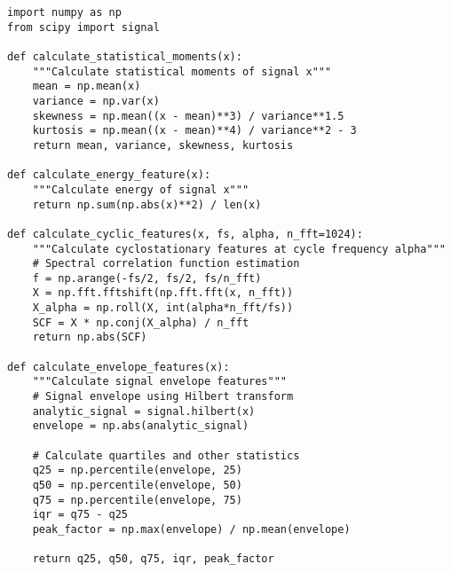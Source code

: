 \begin{verbatim}
import numpy as np
from scipy import signal

def calculate_statistical_moments(x):
    """Calculate statistical moments of signal x"""
    mean = np.mean(x)
    variance = np.var(x)
    skewness = np.mean((x - mean)**3) / variance**1.5
    kurtosis = np.mean((x - mean)**4) / variance**2 - 3
    return mean, variance, skewness, kurtosis

def calculate_energy_feature(x):
    """Calculate energy of signal x"""
    return np.sum(np.abs(x)**2) / len(x)

def calculate_cyclic_features(x, fs, alpha, n_fft=1024):
    """Calculate cyclostationary features at cycle frequency alpha"""
    # Spectral correlation function estimation
    f = np.arange(-fs/2, fs/2, fs/n_fft)
    X = np.fft.fftshift(np.fft.fft(x, n_fft))
    X_alpha = np.roll(X, int(alpha*n_fft/fs))
    SCF = X * np.conj(X_alpha) / n_fft
    return np.abs(SCF)

def calculate_envelope_features(x):
    """Calculate signal envelope features"""
    # Signal envelope using Hilbert transform
    analytic_signal = signal.hilbert(x)
    envelope = np.abs(analytic_signal)
    
    # Calculate quartiles and other statistics
    q25 = np.percentile(envelope, 25)
    q50 = np.percentile(envelope, 50)
    q75 = np.percentile(envelope, 75)
    iqr = q75 - q25
    peak_factor = np.max(envelope) / np.mean(envelope)
    
    return q25, q50, q75, iqr, peak_factor
\end{verbatim}

